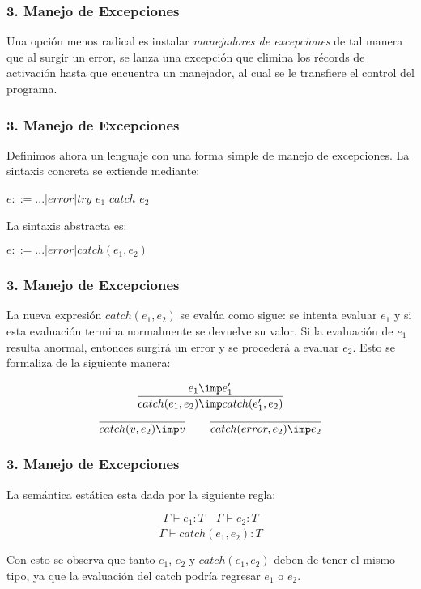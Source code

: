 \documentclass[xcolor=dvipsnames,table,spanish]{beamer}
\begin{document}
\begin{frame}
\frametitle{3. Manejo de Excepciones}
Una opción menos radical es instalar \textit{manejadores de excepciones} de tal manera que al surgir un error, se lanza una excepción que elimina los récords de activación hasta que encuentra un manejador, al cual se le transfiere el control del programa.
\end{frame}

\begin{frame}
\frametitle{3. Manejo de Excepciones}
Definimos ahora un lenguaje con una forma simple de manejo de excepciones.\newline
La sintaxis concreta se extiende mediante:
\begin{center}
      $e::=...|error|try$ $e_1$ $catch$ $e_2$
\end{center}
La sintaxis abstracta es:
\begin{center}
      $e::=...|error|catch(e_1,e_2)$
\end{center}
\end{frame}

\begin{frame}
\frametitle{3. Manejo de Excepciones}
La nueva expresión $catch(e_1,e_2)$ se evalúa como sigue: se intenta evaluar $e_1$ y si esta evaluación termina normalmente se devuelve su valor. Si la evaluación de $e_1$ resulta anormal, entonces surgirá un error y se procederá a evaluar $e_2$. Esto se formaliza de la siguiente manera:

 \begin{center}
      \begin{equation*}
         \frac{e_1 \imp e_1'}{catch(e_1,e_2) \imp catch(e_1',e_2)}
	  \end{equation*}
      \begin{equation*}
         \frac{}{catch(v,e_2) \imp v}
         \qquad
           \frac{}{catch(error,e_2) \imp e_2}
	  \end{equation*}

  \end{center}
\end{frame}

\begin{frame}
\frametitle{3. Manejo de Excepciones}
La semántica estática esta dada por la siguiente regla:
\begin{center}
      \begin{equation*}
         \frac{\Gamma \vdash e_1:T \quad \Gamma \vdash e_2:T}{\Gamma \vdash catch(e_1,e_2):T}
	  \end{equation*}
  \end{center}
  Con esto se observa que tanto $e_1$, $e_2$ y $catch(e_1,e_2)$ deben de tener el mismo tipo, ya que la evaluación del catch podría regresar $e_1$ o $e_2$.
\end{frame}
\end{document}
